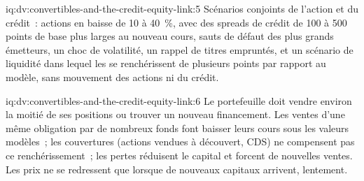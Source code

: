 \begin{solution}{iq:dv:convertibles-and-the-credit-equity-link:5}
Scénarios conjoints de l'action et du crédit~: actions en baisse de 10 à 40~\%, avec des spreads de crédit de 100 à 500 points de base plus larges au nouveau cours, sauts de défaut des plus grands
émetteurs, un choc de volatilité, un rappel de titres empruntés, et un scénario de liquidité dans lequel les  se renchérissent de plusieurs points par rapport au modèle, sans mouvement
des actions ni du crédit.
\end{solution}

\begin{solution}{iq:dv:convertibles-and-the-credit-equity-link:6}
Le portefeuille doit vendre environ la moitié de ses positions ou trouver un nouveau financement. Les ventes d'une même obligation par de nombreux fonds font baisser leurs cours sous les valeurs modèles~; les
couvertures (actions vendues à découvert, CDS) ne compensent pas ce renchérissement~; les pertes réduisent le capital et forcent de nouvelles ventes. Les prix ne se redressent que lorsque de nouveaux capitaux arrivent,
lentement.
\end{solution}
